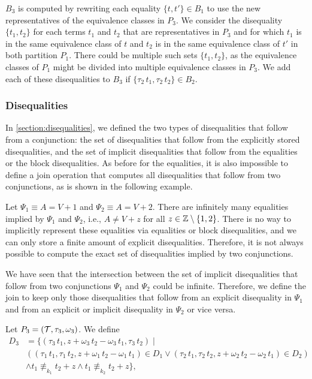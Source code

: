 $B_3$ is computed by rewriting each equality $\{t, t'\} \in B_1$ to use the new representatives of the equivalence classes in $P_3$.
We consider the disequality $\{t_1, t_2\}$
for each terms $t_1$ and $t_2$ that are representatives in $P_3$ and for
which $t_1$ is in the same equivalence class of $t$ and $t_2$ is in the same equivalence class of $t'$ in both partition $P_1$.
There could be multiple such sets $\{t_1, t_2\}$,
as the equivalence classes of $P_1$ might be divided into multiple equivalence classes in $P_3$.
We add each of these disequalities to $B_3$ if $\{\tau_2\,t_1, \tau_2\,t_2\} \in B_2$.

\subsubsection{Disequalities}

In \cref{section:disequalities}, we defined the two types of disequalities that follow from a conjunction:
the set of disequalities that follow from the explicitly stored disequalities,
and the set of implicit disequalities that follow from the equalities or the block disequalities.
As before for the equalities, it is also impossible to define a join operation that computes all disequalities that follow from two conjunctions, as is shown in the following example.

\begin{example}
    Let $\Psi_1 \equiv A = V + 1$ and $\Psi_2 \equiv A = V + 2$. There are infinitely many equalities implied by $\Psi_1$ and $\Psi_2$, i.e., $A \neq V + z$ for all $z \in \mathbb{Z} \setminus \{1,2\}$.
    There is no way to implicitly represent these equalities via equalities or block disequalities, and we can only store a finite amount of explicit disequalities.
    Therefore, it is not always possible to compute the exact set of disequalities implied by two conjunctions.
\end{example}

We have seen that the intersection between the set of implicit disequalities that follow from two conjunctions $\Psi_1$ and $\Psi_2$ could be infinite.
Therefore, we define the join to keep only those disequalities that follow from an explicit disequality in $\Psi_1$ and from an explicit or implicit disequality in $\Psi_2$ or vice versa.

Let $P_3 = (\mathcal{T}, \tau_3, \omega_3)$.
We define
\[
    \begin{array}{ll}
        D_3 & = \{(\tau_3\,t_1,  z + \omega_3\,t_2 - \omega_3\,t_1, \tau_3\,t_2) \mid                                                                            \\
            & ((\tau_1\,t_1, \tau_1\,t_2, z + \omega_1\,t_2 - \omega_1\,t_1) \in D_1 \lor (\tau_2\,t_1, \tau_2\,t_2, z + \omega_2\,t_2 - \omega_2\,t_1) \in D_2) \\
            & \land t_1 \nequiv_{k_1} t_2 + z \land t_1 \nequiv_{k_2} t_2 + z\},
    \end{array}
\]

